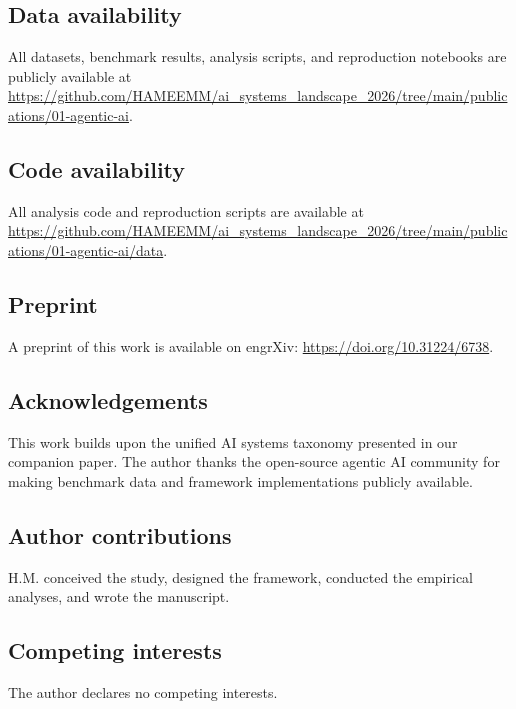 \documentclass[10pt]{article}
\begin{document}
\subsection*{Data availability}

All datasets, benchmark results, analysis scripts, and reproduction notebooks are publicly available at \url{https://github.com/HAMEEMM/ai_systems_landscape_2026/tree/main/publications/01-agentic-ai}.

\subsection*{Code availability}

All analysis code and reproduction scripts are available at \url{https://github.com/HAMEEMM/ai_systems_landscape_2026/tree/main/publications/01-agentic-ai/data}.

\subsection*{Preprint}

A preprint of this work is available on engrXiv: \url{https://doi.org/10.31224/6738}.

\subsection*{Acknowledgements}

This work builds upon the unified AI systems taxonomy presented in our companion paper\cite{mahdi2026taxonomy}. The author thanks the open-source agentic AI community for making benchmark data and framework implementations publicly available.

\subsection*{Author contributions}

H.M. conceived the study, designed the framework, conducted the empirical analyses, and wrote the manuscript.

\subsection*{Competing interests}

The author declares no competing interests.


\end{document}

